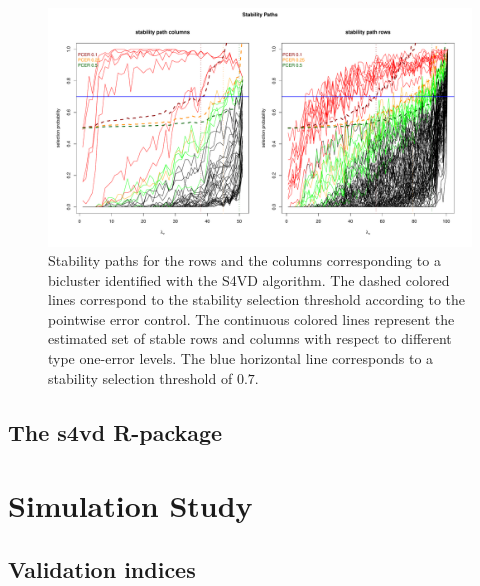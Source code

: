 \begin{center}
\begin{figure}[t]
\includegraphics[width=150 mm]{./Bilder/stabpath.pdf}
\caption{ Stability paths for the rows and the columns corresponding to a bicluster identified with the S4VD algorithm. The dashed colored lines correspond to the stability selection threshold according to the pointwise error control. The continuous colored lines represent the estimated set of stable rows and columns with respect to different type one-error levels. The blue horizontal line corresponds to a stability selection threshold of $0.7$.\label{fig:01} 
}
\end{figure}
\end{center}

\subsection{The s4vd R-package}

\section{Simulation Study}
\subsection{Validation indices}
